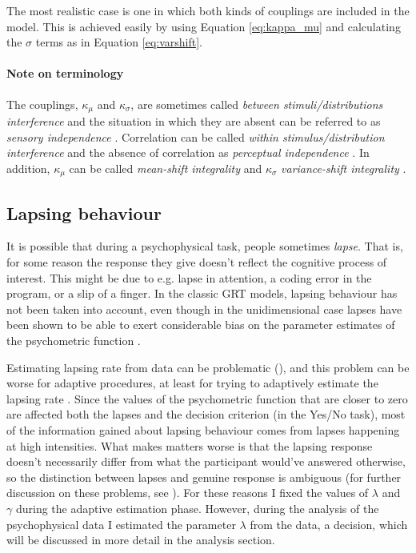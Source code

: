 \documentclass{article}\usepackage{knitr}
\begin{document}
The most realistic case is one in which both kinds of couplings are included in the model. This is achieved easily by using Equation \ref{eq:kappa_mu} and calculating the $\sigma$ terms as in Equation \ref{eq:varshift}.

\paragraph{Note on terminology} 

The couplings, $\kappa_{\mu}$ and $\kappa_{\sigma}$, are sometimes called \textit{between stimuli/distributions interference} \citep{silbert2009} and the situation in which they are absent can be referred to as \textit{sensory independence} \citep{ashby2015}. Correlation can be called \textit{within stimulus/distribution interference} \citep{silbert2009} and the absence of correlation as \textit{perceptual independence} \citep{ashby2015}. In addition, $\kappa_{\mu}$ can be called \textit{mean-shift integrality} and $\kappa_{\sigma}$ \textit{variance-shift integrality} \citep{ashby1994}.

\subsection{Lapsing behaviour}
\label{sec:lapses_general}

It is possible that during a psychophysical task, people sometimes \textit{lapse}. That is, for some reason the response they give doesn't reflect the cognitive process of interest. This might be due to e.g. lapse in attention, a coding error in the program, or a slip of a finger. In the classic GRT models, lapsing behaviour has not been taken into account, even though in the unidimensional case lapses have been shown to be able to exert considerable bias on the parameter estimates of the psychometric function \citep{wichmannhill2001}. 

Estimating lapsing rate from data can be problematic (\cite{wichmannhill2001, treutwein1999}), and this problem can be worse for adaptive procedures, at least for trying to adaptively estimate the lapsing rate \citep{prins2012}. Since the values of the psychometric function that are closer to zero are affected both the lapses and the decision criterion (in the Yes/No task), most of the information gained about lapsing behaviour comes from lapses happening at high intensities. What makes matters worse is that the lapsing response doesn't necessarily differ from what the participant would've answered otherwise, so the distinction between lapses and genuine response is ambiguous (for further discussion on these problems, see \cite{prins2012}). For these reasons I fixed the values of $\lambda$ and $\gamma$ during the adaptive estimation phase. However, during the analysis of the psychophysical data I estimated the parameter $\lambda$ from the data, a decision, which will be discussed in more detail in the analysis section.
\end{document}
